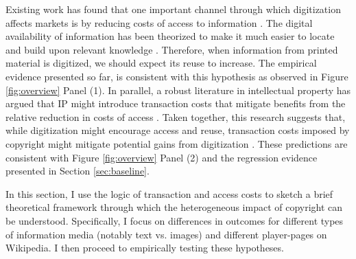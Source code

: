 \documentclass[11pt]{article}
\begin{document}
Existing work has found that one important channel through which digitization affects markets is by reducing costs of access to information \citep{goldfarb_introduction_2014, bakos_reducing_1997}. The digital availability of information has been theorized to make it much easier to locate and build upon relevant knowledge \citep{shapiro_information_1999, chiou_copyright_2011}. Therefore, when information from printed material is digitized, we should expect its reuse to increase. The empirical evidence presented so far, is consistent with this hypothesis as observed in Figure \ref{fig:overview} Panel (1). In parallel, a robust literature in intellectual property has argued that IP might introduce transaction costs that mitigate benefits from the relative reduction in costs of access \citep{waldfogel_copyright_2012, williams_intellectual_2013, murray_formal_2007}. Taken together, this research suggests that, while digitization might encourage access and reuse, transaction costs imposed by copyright might mitigate potential gains from digitization \citep{gans_remix_2015}. These predictions are consistent with Figure \ref{fig:overview} Panel (2) and the regression evidence presented in Section \ref{sec:baseline}.

In this section, I use the logic of transaction and access costs to sketch a brief theoretical framework through which the heterogeneous impact of copyright can be understood. Specifically, I focus on differences in outcomes for different types of information media (notably text vs. images) and different player-pages on Wikipedia. I then proceed to empirically testing these hypotheses. 


\end{document}

